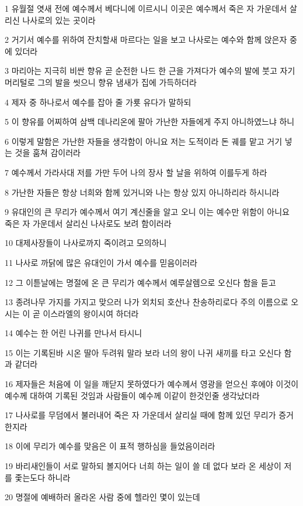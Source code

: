 \par 1 유월절 엿새 전에 예수께서 베다니에 이르시니 이곳은 예수께서 죽은 자 가운데서 살리신 나사로의 있는 곳이라
\par 2 거기서 예수를 위하여 잔치할새 마르다는 일을 보고 나사로는 예수와 함께 앉은자 중에 있더라
\par 3 마리아는 지극히 비싼 향유 곧 순전한 나드 한 근을 가져다가 예수의 발에 붓고 자기 머리털로 그의 발을 씻으니 향유 냄새가 집에 가득하더라
\par 4 제자 중 하나로서 예수를 잡아 줄 가룟 유다가 말하되
\par 5 이 향유를 어찌하여 삼백 데나리온에 팔아 가난한 자들에게 주지 아니하였느냐 하니
\par 6 이렇게 말함은 가난한 자들을 생각함이 아니요 저는 도적이라 돈 궤를 맡고 거기 넣는 것을 훔쳐 감이러라
\par 7 예수께서 가라사대 저를 가만 두어 나의 장사 할 날을 위하여 이를두게 하라
\par 8 가난한 자들은 항상 너희와 함께 있거니와 나는 항상 있지 아니하리라 하시니라
\par 9 유대인의 큰 무리가 예수께서 여기 계신줄을 알고 오니 이는 예수만 위함이 아니요 죽은 자 가운데서 살리신 나사로도 보려 함이러라
\par 10 대제사장들이 나사로까지 죽이려고 모의하니
\par 11 나사로 까닭에 많은 유대인이 가서 예수를 믿음이러라
\par 12 그 이튿날에는 명절에 온 큰 무리가 예수께서 예루살렘으로 오신다 함을 듣고
\par 13 종려나무 가지를 가지고 맞으러 나가 외치되 호산나 찬송하리로다 주의 이름으로 오시는 이 곧 이스라엘의 왕이시여 하더라
\par 14 예수는 한 어린 나귀를 만나서 타시니
\par 15 이는 기록된바 시온 딸아 두려워 말라 보라 너의 왕이 나귀 새끼를 타고 오신다 함과 같더라
\par 16 제자들은 처음에 이 일을 깨닫지 못하였다가 예수께서 영광을 얻으신 후에야 이것이 예수께 대하여 기록된 것임과 사람들이 예수께 이같이 한것인줄 생각났더라
\par 17 나사로를 무덤에서 불러내어 죽은 자 가운데서 살리실 때에 함께 있던 무리가 증거한지라
\par 18 이에 무리가 예수를 맞음은 이 표적 행하심을 들었음이러라
\par 19 바리새인들이 서로 말하되 볼지어다 너희 하는 일이 쓸 데 없다 보라 온 세상이 저를 좇는도다 하니라
\par 20 명절에 예배하러 올라온 사람 중에 헬라인 몇이 있는데
